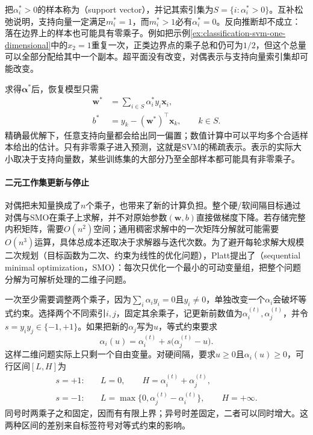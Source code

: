 把$\alpha_i^{\ast}>0$的样本称为（support vector），并记其索引集为$S=\{i:\alpha_i^{\ast}>0\}$。互补松弛说明，支持向量一定满足$m_i^{\ast}=1$，而$m_i^{\ast}>1$必有$\alpha_i^{\ast}=0$。反向推断却不成立：落在边界上的样本也可能具有零乘子。例如把示例\ref{ex:classification-svm-one-dimensional}中的$x_2=1$重复一次，正类边界点的乘子总和仍可为$1/2$，但这个总量可以全部分配给其中一个副本。超平面没有改变，对偶表示与支持向量索引集却可能改变。

求得$\bm{\alpha}^{\ast}$后，恢复模型只需
\begin{equation}
  \begin{aligned}
    \bm{w}^{\ast}
      &=\sum_{i\in S}\alpha_i^{\ast}y_i\bm{x}_i,\\
    b^{\ast}
      &=y_k-(\bm{w}^{\ast})^{\top}\bm{x}_k,
        \qquad k\in S.
  \end{aligned}
  \label{eq:classification-svm-recover}
\end{equation}
精确最优解下，任意支持向量都会给出同一偏置；数值计算中可以平均多个合适样本给出的估计。只有非零乘子进入预测，这就是SVM的稀疏表示。表示的实际大小取决于支持向量数，某些训练集的大部分乃至全部样本都可能具有非零乘子。

\paragraph{二元工作集更新与停止}
\label{sec:classification-svm-smo}

对偶把未知量换成了$n$个乘子，也带来了新的计算负担。整个硬/软间隔目标通过对偶与SMO在乘子上求解，并不对原始参数$(\bm w,b)$直接做梯度下降。若存储完整内积矩阵，需要$O(n^2)$空间；通用稠密求解中的一次矩阵分解就可能需要$O(n^3)$运算，具体总成本还取决于求解器与迭代次数。为了避开每轮求解大规模二次规划（目标函数为二次、约束为线性的优化问题），Platt提出了（sequential minimal optimization，SMO）：每次只优化一个最小的可动变量组，把整个问题分解为可解析处理的二维子问题。

一次至少需要调整两个乘子，因为$\sum_i\alpha_i y_i=0$且$y_i\ne0$，单独改变一个$\alpha_i$会破坏等式约束。选择两个不同索引$i,j$，固定其余乘子，记更新前数值为$\alpha_i^{(t)},\alpha_j^{(t)}$，并令$s=y_i y_j\in\{-1,+1\}$。如果把新的$\alpha_j$写为$u$，等式约束要求
\begin{equation}
  \alpha_i(u)
  =\alpha_i^{(t)}
    +s\bigl(\alpha_j^{(t)}-u\bigr).
  \label{eq:classification-svm-smo-coupling}
\end{equation}
这样二维问题实际上只剩一个自由变量。对硬间隔，要求$u\ge0$且$\alpha_i(u)\ge0$，可行区间$[L,H]$为
\begin{equation}
  \begin{aligned}
    s=+1:\quad&
      L=0,\qquad H=\alpha_i^{(t)}+\alpha_j^{(t)},\\
    s=-1:\quad&
      L=\max\{0,\alpha_j^{(t)}-\alpha_i^{(t)}\},
      \qquad H=+\infty.
  \end{aligned}
  \label{eq:classification-svm-smo-hard-interval}
\end{equation}
同号时两乘子之和固定，因而有有限上界；异号时差固定，二者可以同时增大。这两种区间的差别来自标签符号对等式约束的影响。


